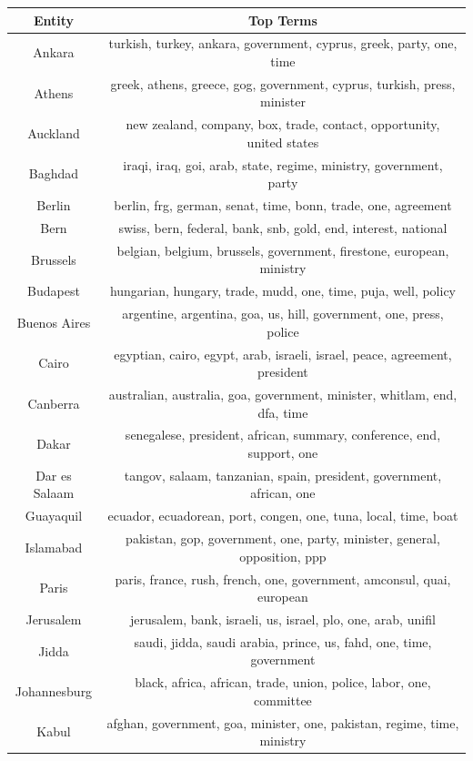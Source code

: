 \begin{table}[htb]
\centering
\small
\begin{tabular}{cc}
\toprule
\textbf{Entity} & \textbf{Top Terms} \\
\midrule
Ankara & turkish, turkey, ankara, government, cyprus, greek, party, one, time \\
Athens & greek, athens, greece, gog, government, cyprus, turkish, press, minister \\
Auckland & new zealand, company, box, trade, contact, opportunity, united states \\
Baghdad & iraqi, iraq, goi, arab, state, regime, ministry, government, party \\
Berlin & berlin, frg, german, senat, time, bonn, trade, one, agreement \\
Bern & swiss, bern, federal, bank, snb, gold, end, interest, national \\
Brussels & belgian, belgium, brussels, government, firestone, european, ministry \\
Budapest & hungarian, hungary, trade, mudd, one, time, puja, well, policy \\
Buenos Aires & argentine, argentina, goa, us, hill, government, one, press, police \\
Cairo & egyptian, cairo, egypt, arab, israeli, israel, peace, agreement, president \\
Canberra & australian, australia, goa, government, minister, whitlam, end, dfa, time \\
Dakar & senegalese, president, african, summary, conference, end, support, one \\
Dar es Salaam & tangov, salaam, tanzanian, spain, president, government, african, one \\
Guayaquil & ecuador, ecuadorean, port, congen, one, tuna, local, time, boat \\
Islamabad & pakistan, gop, government, one, party, minister, general, opposition, ppp \\
Paris & paris, france, rush, french, one, government, amconsul, quai, european \\
Jerusalem & jerusalem, bank, israeli, us, israel, plo, one, arab, unifil \\
Jidda & saudi, jidda, saudi arabia, prince, us, fahd, one, time, government \\
Johannesburg & black, africa, african, trade, union, police, labor, one, committee \\
Kabul & afghan, government, goa, minister, one, pakistan, regime, time, ministry \\

\end{tabular}
\end{table}
